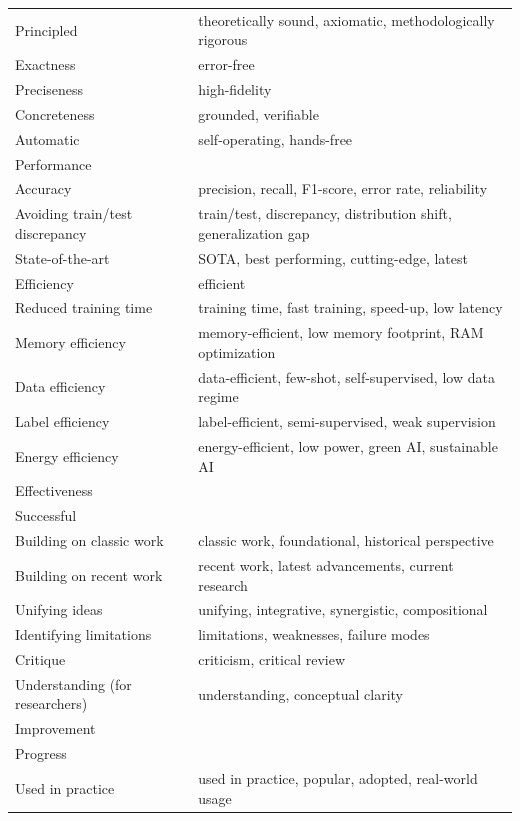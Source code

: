 \documentclass{article}
\begin{document}
\begin{longtable}{|p{5cm}|p{10cm}|}
    Principled & theoretically sound, axiomatic, methodologically rigorous \\ 
    Exactness & error-free \\ 
    Preciseness & high-fidelity \\ 
    Concreteness & grounded, verifiable \\ 
    Automatic & self-operating, hands-free \\ 
    Performance & \\ 
    Accuracy & precision, recall, F1-score, error rate, reliability \\ 
    Avoiding train/test discrepancy & train/test, discrepancy, distribution shift, generalization gap \\ 
    State-of-the-art & SOTA, best performing, cutting-edge, latest \\ 
    Efficiency & efficient \\ 
    Reduced training time & training time, fast training, speed-up, low latency \\ 
    Memory efficiency & memory-efficient, low memory footprint, RAM optimization \\ 
    Data efficiency & data-efficient, few-shot, self-supervised, low data regime \\ 
    Label efficiency & label-efficient, semi-supervised, weak supervision \\ 
    Energy efficiency & energy-efficient, low power, green AI, sustainable AI \\ 
    Effectiveness & \\ 
    Successful & \\ 
    Building on classic work & classic work, foundational, historical perspective \\ 
    Building on recent work & recent work, latest advancements, current research \\ 
    Unifying ideas & unifying, integrative, synergistic, compositional \\ 
    Identifying limitations & limitations, weaknesses, failure modes \\ 
    Critique & criticism, critical review \\ 
    Understanding (for researchers) & understanding, conceptual clarity \\ 
    Improvement & \\ 
    Progress & \\ 
    Used in practice & used in practice, popular, adopted, real-world usage \\ 

\end{longtable}
\end{document}
